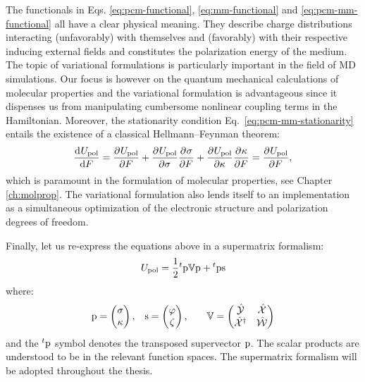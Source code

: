 The functionals in Eqs. \eqref{eq:pcm-functional},
\eqref{eq:mm-functional} and \eqref{eq:pcm-mm-functional} all have a
clear physical meaning.
They describe charge distributions interacting (unfavorably) with
themselves and (favorably) with their respective inducing external
fields and constitutes the polarization energy of the medium.
The topic of variational formulations is particularly important in the
field of \acrshort{MD} simulations.\autocite{Jadhao2012-gf, Jadhao2013-ry, Jadhao2013-hs,
Solis2013-ef}
Our focus is however on the quantum mechanical calculations of molecular
properties and the variational formulation is advantageous since it
dispenses us from manipulating cumbersome nonlinear coupling terms in
the Hamiltonian.
Moreover, the stationarity condition Eq.~\ref{eq:pcm-mm-stationarity}
entails the existence of a classical Hellmann--Feynman theorem:
\begin{equation}\label{eq:classical-HF}
  \frac{\mathop{}\!\mathrm{d}^{}U_\mathrm{pol}}{\mathop{}\!\mathrm{d} F^{}} = \frac{\partial^{}U_\mathrm{pol}} {\partial F^{}}
  + \frac{\partial^{}U_\mathrm{pol}} {\partial \sigma^{}}\frac{\partial^{}\sigma} {\partial F^{}}
  + \frac{\partial^{}U_\mathrm{pol}} {\partial \kappa^{}}\frac{\partial^{}\kappa} {\partial F^{}}
  = \frac{\partial^{}U_\mathrm{pol}} {\partial F^{}},
\end{equation}
which is paramount in the formulation of molecular properties, see
Chapter \ref{ch:molprop}.
The variational formulation also lends itself to an implementation
as a simultaneous optimization of the electronic structure and
polarization degrees of freedom.\autocite{Lipparini2011-aj}

Finally, let us re-express the equations above in a supermatrix
formalism:
\begin{equation}\label{eq:supermatrix-functional}
  U_\mathrm{pol} =
  \frac{1}{2}{}^t\mathrm{p}\mathbb{V}\mathrm{p} + {}^t\mathrm{p}\mathrm{s}
\end{equation}
where:
\begin{alignat}{3}
  \mathrm{p} =
  \begin{pmatrix}
    \sigma \\
    \kappa
  \end{pmatrix},
  \quad&
  \mathrm{s} =
  \begin{pmatrix}
   \varphi \\
   \zeta
  \end{pmatrix},
  \quad&
  \mathbb{V} =
  \begin{pmatrix}
    \hat{\mathcal{Y}} & \hat{\mathcal{X}} \\
    \hat{\mathcal{X}}^\dagger & \hat{\mathcal{W}}
  \end{pmatrix}
\end{alignat}
and the ${}^t\mathrm{p}$ symbol denotes the transposed supervector $\mathrm{p}$.
The scalar products are understood to be in the relevant function
spaces.
The supermatrix formalism will be adopted throughout the thesis.

